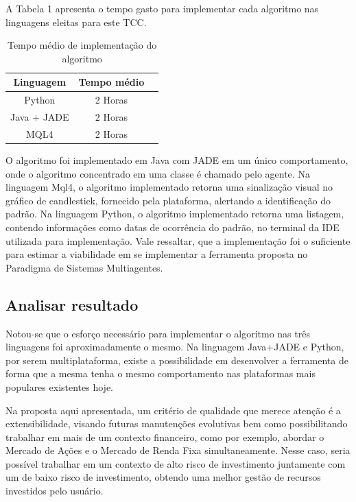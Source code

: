 A Tabela 1  apresenta o tempo gasto para implementar cada algoritmo nas linguagens eleitas para este TCC.

\begin{table}[h]
	\centering
	\label{t01}
	
	\begin{tabular}{ccc}
		\toprule
		\textbf{Linguagem} & \textbf{Tempo médio}\\
		\midrule
		Python & 2 Horas  \\
		Java + JADE & 2 Horas  \\
		MQL4 & 2 Horas  \\
		\bottomrule
	\end{tabular}

	\caption{Tempo médio de implementação do algoritmo}
\end{table}

O algoritmo foi implementado em Java com JADE em um único comportamento, onde o algoritmo concentrado em uma classe é chamado pelo agente. Na linguagem Mql4, o algoritmo implementado retorna uma sinalização visual no gráfico de candlestick, fornecido pela plataforma, alertando a identificação do padrão. Na linguagem Python, o algoritmo implementado retorna uma listagem, contendo informações como datas de ocorrência do padrão, no terminal da IDE utilizada para implementação. Vale ressaltar, que a implementação foi o suficiente para estimar a viabilidade em se implementar a ferramenta proposta no Paradigma de Sistemas Multiagentes.


\subsection{Analisar resultado}

Notou-se que o esforço necessário para implementar o algoritmo nas três linguagens foi aproximadamente o mesmo. Na linguagem Java+JADE e Python, por serem multiplataforma, existe a possibilidade em desenvolver a ferramenta de forma que a mesma tenha o mesmo comportamento nas plataformas mais populares existentes hoje.

Na proposta aqui apresentada, um critério de qualidade que merece atenção é a extensibilidade, visando futuras manutenções evolutivas bem como possibilitando trabalhar em mais de um contexto financeiro, como por exemplo, abordar o Mercado de Ações e o Mercado de Renda Fixa simultaneamente. Nesse caso, seria possível trabalhar em um contexto de alto risco de investimento juntamente com um de baixo risco de investimento, obtendo uma melhor gestão de recursos investidos pelo usuário.


